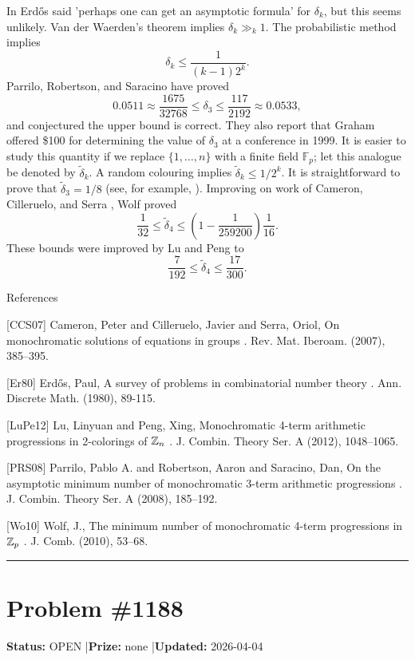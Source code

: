 \documentclass{article}
\begin{document}
In \cite{Er80} Erd\H{o}s said 'perhaps one can get an asymptotic formula' for $\delta_k$, but this seems unlikely. Van der Waerden's theorem implies $\delta_k\gg_k 1$. The probabilistic method implies\[\delta_k \leq \frac{1}{(k-1)2^{k}}.\]Parrilo, Robertson, and Saracino \cite{PRS08} have proved\[0.0511\approx \frac{1675}{32768}\leq \delta_3 \leq \frac{117}{2192}\approx 0.0533,\]and conjectured the upper bound is correct. They also report that Graham offered \$100 for determining the value of $\delta_3$ at a conference in 1999. It is easier to study this quantity if we replace $\{1,\ldots,n\}$ with a finite field $\mathbb{F}_p$; let this analogue be denoted by $\tilde{\delta}_k$. A random colouring implies $\tilde{\delta}_k\leq 1/2^{k}$. It is straightforward to prove that $\tilde{\delta}_3=1/8$ (see, for example, \cite{Wo10}). Improving on work of Cameron, Cilleruelo, and Serra \cite{CCS07}, Wolf \cite{Wo10} proved\[\frac{1}{32}\leq \tilde{\delta}_4\leq \left(1-\frac{1}{259200}\right)\frac{1}{16}.\]These bounds were improved by Lu and Peng \cite{LuPe12} to\[\frac{7}{192}\leq \tilde{\delta}_4\leq \frac{17}{300}.\]




References

[CCS07] Cameron, Peter and Cilleruelo, Javier and Serra, Oriol, On monochromatic solutions of equations in groups . Rev. Mat. Iberoam. (2007), 385--395.

[Er80] Erd\H{o}s, Paul, A survey of problems in combinatorial number theory . Ann. Discrete Math. (1980), 89-115.

[LuPe12] Lu, Linyuan and Peng, Xing, Monochromatic 4-term arithmetic progressions in 2-colorings of {$\Bbb Z_n$} . J. Combin. Theory Ser. A (2012), 1048--1065.

[PRS08] Parrilo, Pablo A. and Robertson, Aaron and Saracino, Dan, On the asymptotic minimum number of monochromatic 3-term arithmetic progressions . J. Combin. Theory Ser. A (2008), 185--192.

[Wo10] Wolf, J., The minimum number of monochromatic 4-term progressions in {$\Bbb Z_p$} . J. Comb. (2010), 53--68.

\noindent\rule{\linewidth}{0.4pt}


\section{Problem \#1188}
\label{prob:1188}

\noindent\textbf{Status:} OPEN \quad|\quad \textbf{Prize:} none \quad|\quad \textbf{Updated:} 2026-04-04
\end{document}
